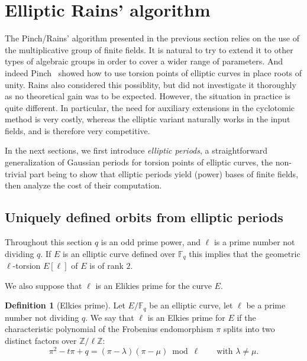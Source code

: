 \documentclass[12pt]{article}
\theoremstyle{plain}
\theoremstyle{definition}
\newtheorem{definition}[theorem]{Definition}
\def\Z{\ensuremath{\mathbb{Z}}}
\def\F{\ensuremath{\mathbb{F}}}
\newcounter{algorithm}
\begin{document}

\section{Elliptic Rains' algorithm}
\label{sec:rains-elliptic}

The Pinch/Rains' algorithm presented in the previous section relies on the use
of the multiplicative group of finite fields.
It is natural to try to extend it to other types of algebraic groups in
order to cover a wider range of parameters.
And indeed Pinch~\cite{Pinch} showed how to use torsion points of elliptic
curves in place roots of unity.
Rains also considered this possiblity, but did not investigate it thoroughly
as no theoretical gain was to be expected.
However, the situation in practice is quite different.
In particular, the need for auxiliary extensions in the cyclotomic method
is very costly, whereas the elliptic variant naturally works in the input 
fields, and is therefore very competitive.

In the next sections, we first introduce \emph{elliptic periods}, a
straightforward generalization of Gaussian periods for torsion points
of elliptic curves, the non-trivial part being to show that
elliptic periods yield (power) bases of finite fields,
then analyze the cost of their computation.

\subsection{Uniquely defined orbits from elliptic periods}

Throughout this section $q$ is an odd prime power, and $\ell$ is
a prime number not dividing $q$.  If $E$ is an elliptic curve
defined over $\F_q$ this implies that the geometric $\ell$-torsion
$E[\ell]$ of $E$ is of rank $2$.

We also suppose that $\ell$ is an Elikies prime for the curve $E$.
\begin{definition}[Elkies prime]
  Let $E/\F_q$ be an elliptic curve, let $\ell$ be a prime number not
  dividing $q$.  We say that $\ell$ is an Elkies prime for $E$ if the
  characteristic polynomial of the Frobenius endomorphism $\pi$ splits
  into two distinct factors over $\Z/\ell\Z$:
\begin{equation}
\pi^2-t\pi+q=(\pi-\lambda)(\pi-\mu)\bmod\ell
\qquad\text{with $\lambda\ne\mu$}.
\end{equation}
\end{definition}
\end{document}
